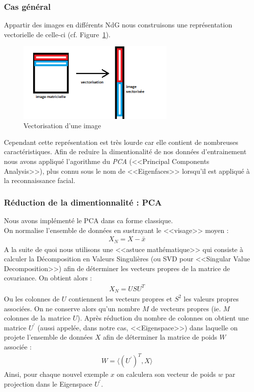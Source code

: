 \documentclass[a4paper,10pt,twocolumn]{extarticle}
\begin{document}
\subsubsection{Cas général}
Appartir des images en différents NdG nous construisons une représentation vectorielle de celle-ci (cf. Figure~\ref{fig:vectorisation}).
\begin{figure}[H]
  \begin{center}
    \includegraphics[width=220pt]{images_rapport/vectorisation.png}
    \caption{Vectorisation d'une image}
    \label{fig:vectorisation}
  \end{center}
\end{figure}
Cependant cette représentation est très lourde car elle contient de nombreuses caractéristiques. Afin de reduire la dimentionalité de nos données d'entrainement nous avons appliqué l'agorithme du \textit{PCA} (<<Principal Components Analysis>>), plus connu sous le nom de <<Eigenfaces>> \cite{turk91} lorsqu'il est appliqué à la reconnaissance facial.

\subsubsection{Réduction de la dimentionnalité : PCA}
Nous avons implémenté le PCA dans ca forme classique.\\
On normalise l'ensemble de données en sustrayant le <<visage>> moyen :
\begin{align}
  X_N = X - \bar{x}
\end{align}
A la suite de quoi nous utilisons une <<astuce mathématique>> qui consiste à calculer la Décomposition en Valeurs Singulières (ou SVD pour <<Singular Value Decomposition>>) afin de déterminer les vecteurs propres de la matrice de covariance. On obtient alors :
\begin{align}
  X_N = USU^T
\end{align}
Ou les colonnes de $U$ contiennent les vecteurs propres et $S^2$ les valeurs propres associées. On ne conserve alors qu'un nombre $M$ de vecteurs propres (ie. $M$ colonnes de la matrice $U$). Après réduction du nombre de colonnes on obtient une matrice $U^{\prime}$ (aussi appelée, dans notre cas, <<Eigenspace>>) dans laquelle on projete l'ensemble de données $X$ afin de déterminer la matrice de poids $W$ associée :
\begin{align}
  W = \langle (U^{\prime})^T , X \rangle
\end{align}
Ainsi, pour chaque nouvel exemple $x$ on calculera son vecteur de poids $w$ par projection dans le Eigenspace $U^{\prime}$.
\end{document}
